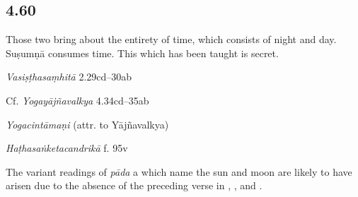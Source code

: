 \begin{ekdosis}

\subsection*{4.60}
\begin{translation}[hp04_060]
Those two bring about the entirety of time, which consists of night and day. Suṣumṇā consumes time. This which has been taught is secret.
\end{translation}

\begin{sources}[hp04_060]
\emph{Vasiṣṭhasaṃhitā} 2.29cd–30ab
\begin{versinnote}
\end{versinnote}

Cf. \emph{Yogayājñavalkya} 4.34cd–35ab
\begin{versinnote}
\end{versinnote}
\end{sources}

\begin{testimonia}[hp04_060]
\emph{Yogacintāmaṇi} (attr. to Yājñavalkya)
\begin{versinnote}
\end{versinnote}

\emph{Haṭhasaṅketacandrikā} f. 95v
\begin{versinnote}
\end{versinnote}
\end{testimonia}

\begin{philcomm}[hp04_060]
The variant readings of \emph{pāda} a which name the sun and moon are likely to have arisen due to the absence of the preceding verse in 
\textepsilon, \texteta, and \textzeta.
\end{philcomm}


\end{ekdosis}
